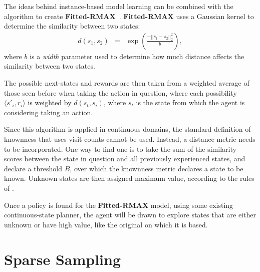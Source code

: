 The ideas behind instance-based model learning can be combined with the  algorithm to create {\bf Fitted-RMAX}~\cite{jong07}. {\bf Fitted-RMAX} uses a Gaussian kernel to determine the similarity between two states:
\begin{eqnarray}
d(s_1,s_2)&=&\exp\left(\frac{-||s_1 - s_2||^2_2}{b}\right),
\end{eqnarray}
where $b$ is a \emph{width} parameter used to determine how much distance affects the similarity between two states.

The possible next-states and rewards are then taken from a weighted average of those seen before when taking the action in question, where each possibility $\langle s'_i, r_i \rangle$ is weighted by $d(s_t, s_i)$, where $s_t$ is the state from which the agent is considering taking an action.


Since this algorithm is applied in continuous domains, the standard definition of knownness that uses visit counts cannot be used.  Instead, a distance metric needs to be incorporated. One way to find one is to take the sum of the similarity scores between the state in question and all previously experienced states, and declare a threshold $B$, over which the knownness metric declares a state to be known.  Unknown states are then assigned maximum value, according to the rules of .

Once a policy is found for the {\bf Fitted-RMAX} model, using some existing continuous-state planner, the agent will be drawn to explore states that are either unknown or have high value, like the original  on which it is based.



\section{Sparse Sampling}

\label{sec:rel:ss}

